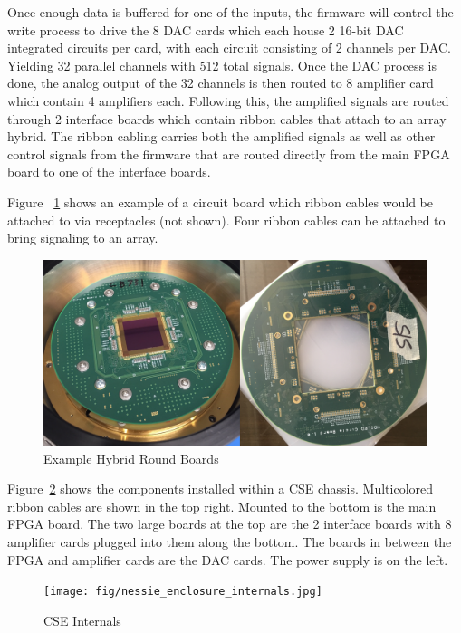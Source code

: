     Once enough data is buffered for one of the inputs, the firmware will control the write process to drive the 8 DAC cards which each house 2 16-bit DAC integrated circuits per card, with each circuit consisting of 2 channels per DAC. Yielding 32 parallel channels with 512 total signals. Once the DAC process is done, the analog output of the 32 channels is then routed to 8 amplifier card which contain 4 amplifiers each. Following this, the amplified signals are routed through 2 interface boards which contain ribbon cables that attach to an array hybrid. The ribbon cabling carries both the amplified signals as well as other control signals from the firmware that are routed directly from the main FPGA board to one of the interface boards.

    Figure ~\ref{fig:round_board} shows an example of a circuit board which ribbon cables would be attached to via receptacles (not shown). Four ribbon cables can be attached to bring signaling to an array.

    \begin{figure}
        \centering
        \includegraphics[width=1.0\textwidth]{fig/round_board.png}
        \caption{Example Hybrid Round Boards}
        \label{fig:round_board}
    \end{figure}

    Figure~\ref{fig:nessie_enclosure_internals} shows the components installed within a CSE chassis. Multicolored ribbon cables are shown in the top right. Mounted to the bottom is the main FPGA board. The two large boards at the top are the 2 interface boards with 8 amplifier cards plugged into them along the bottom. The boards in between the FPGA and amplifier cards are the DAC cards. The power supply is on the left.

    \begin{figure}
        \centering
        \texttt{[image: fig/nessie\_enclosure\_internals.jpg]}
        \caption{CSE Internals}
        \label{fig:nessie_enclosure_internals}
    \end{figure}

